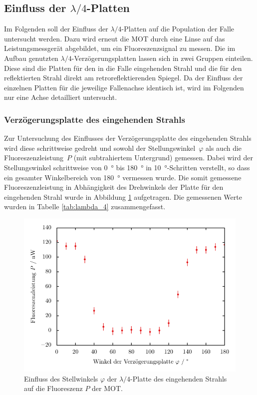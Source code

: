\documentclass[11pt, a4paper]{article}
\numberwithin{equation}{section}
\begin{document}
\subsection{Einfluss der $\lambda / 4$-Platten}
Im Folgenden soll der Einfluss der $\lambda / 4$-Platten auf die Population der Falle untersucht werden.
Dazu wird erneut die MOT durch eine Linse auf das Leistungsmessgerät abgebildet, um ein Fluoreszenzsignal zu messen.
Die im Aufbau genutzten $\lambda / 4$-Verzögerungsplatten lassen sich in zwei Gruppen einteilen.
Diese sind die Platten für den in die Falle eingehenden Strahl und die für den reflektierten Strahl direkt am retroreflektierenden Spiegel.
Da der Einfluss der einzelnen Platten für die jeweilige Fallenachse identisch ist, wird im Folgenden nur eine Achse detailliert untersucht.

\subsubsection{Verzögerungsplatte des eingehenden Strahls}
\label{sec:lambda_4_inc}
Zur Untersuchung des Einflusses der Verzögerungsplatte des eingehenden Strahls wird diese schrittweise gedreht und sowohl der Stellungswinkel~$\varphi$ als auch die Fluoreszenzleistung~$P$ (mit subtrahiertem Untergrund) gemessen.
Dabei wird der Stellungswinkel schrittweise von \SI{0}{\degree} bis \SI{180}{\degree} in \SI{10}{\degree}-Schritten verstellt, so dass ein gesamter Winkelbereich von \SI{180}{\degree} vermessen wurde.
Die somit gemessene Fluoreszenzleistung in Abhängigkeit des Drehwinkels der Platte für den eingehenden Strahl wurde in Abbildung \ref{fig:lambda_4_inc} aufgetragen.
Die gemessenen Werte wurden in Tabelle \ref{tab:lambda_4} zusammengefasst.
\begin{figure}[h]
	\centering
	\includegraphics{./figures/lambda_4_in.pdf}
	\caption{Einfluss des Stellwinkels $\varphi$ der $\lambda / 4$-Platte des eingehenden Strahls auf die Fluoreszenz $P$ der MOT.}
	\label{fig:lambda_4_inc}
\end{figure}
\end{document}
